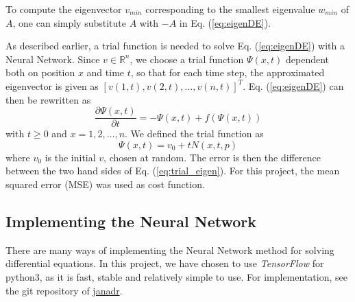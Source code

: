 To compute the eigenvector $v_{min}$ corresponding to the smallest eigenvalue $w_{min}$ of $A$, one can simply substitute $A$ with $-A$ in Eq. (\ref{eq:eigenDE}).

As described earlier, a trial function is needed to solve Eq. (\ref{eq:eigenDE}) with a Neural Network. Since $v \in \mathbb{R}^n$, we choose a trial function $\Psi(x,t)$ dependent both on position $x$ and time $t$, so that for each time step, the approximated eigenvector is given as $[v(1,t), v(2,t), \ldots, v(n,t)]^T$. Eq. (\ref{eq:eigenDE}) can then be rewritten as
\begin{equation}\label{eq:trial_eigen}
	\frac{\partial \Psi(x,t)}{\partial t} = -\Psi(x,t) + f(\Psi(x,t))
\end{equation}
with $t \geq 0$ and $x=1,2,\ldots,n$. We defined the trial function as
\begin{equation*}
	 \Psi(x,t) = v_0 + tN(x,t,p)
\end{equation*}
where $v_0$ is the initial $v$, chosen at random.
The error is then the difference between the two hand sides of Eq. (\ref{eq:trial_eigen}). For this project, the mean squared error (MSE) was used as cost function.

\subsection{Implementing the Neural Network}
There are many ways of implementing the Neural Network method for solving differential equations. In this project, we have chosen to use \textit{TensorFlow} for python3, as it is fast, stable and relatively simple to use. For implementation, see the git repository of \href{https://github.com/janadr/FYS-STK4155/tree/master/project3/code}{janadr}.
